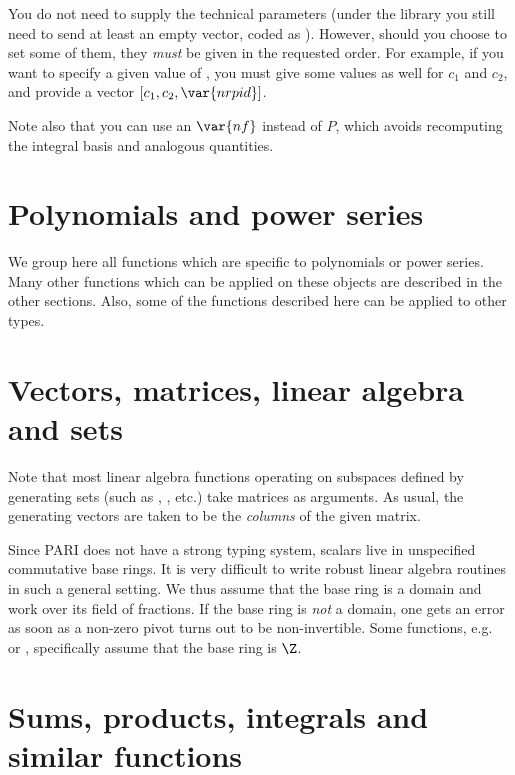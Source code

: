 You do not need to supply the technical parameters (under the library you
still need to send at least an empty vector, coded as ). However,
should you choose to set some of them, they \emph{must} be given in the
requested order. For example, if you want to specify a given value of
, you must give some values as well for $c_1$ and $c_2$, and provide
a vector $[c_1,c_2,\var{nrpid}]$.

Note also that you can use an $\var{nf}$ instead of $P$, which avoids
recomputing the integral basis and analogous quantities.

\smallskip


\section{Polynomials and power series}

We group here all functions which are specific to polynomials or power
series. Many other functions which can be applied on these objects are
described in the other sections. Also, some of the functions described here
can be applied to other types.


\section{Vectors, matrices, linear algebra and sets}
\label{se:linear_algebra}

Note that most linear algebra functions operating on subspaces defined by
generating sets (such as , , etc.) take matrices as
arguments. As usual, the generating vectors are taken to be the
\emph{columns} of the given matrix.

Since PARI does not have a strong typing system, scalars live in
unspecified commutative base rings. It is very difficult to write
robust linear algebra routines in such a general setting. We thus
assume that the base ring is a domain and work over its field of
fractions. If the base ring is \emph{not} a domain, one gets an error as soon
as a non-zero pivot turns out to be non-invertible. Some functions,
e.g.~ or , specifically assume that the base ring is
$\Z$.


\section{Sums, products, integrals and similar functions}
\label{se:sums}


